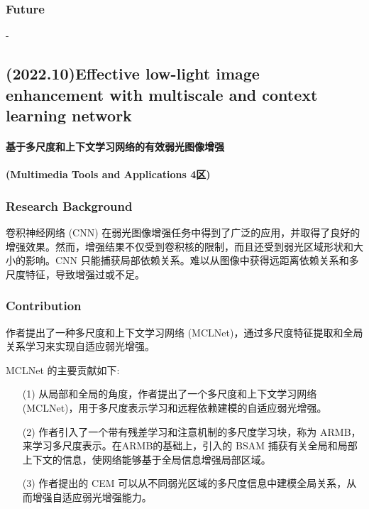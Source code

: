 \documentclass[a4paper, 10pt]{article}
\begin{document}
			\subsubsection{Future}
			
			-
		
		\subsection{(2022.10)Effective low-light image enhancement with multiscale and context learning network}
		
		\paragraph{基于多尺度和上下文学习网络的有效弱光图像增强}
		
		\paragraph{(Multimedia Tools and Applications 4区)}
		
			\subsubsection{Research Background}
			
			卷积神经网络 (CNN) 在弱光图像增强任务中得到了广泛的应用，并取得了良好的增强效果。然而，增强结果不仅受到卷积核的限制，而且还受到弱光区域形状和大小的影响。CNN 只能捕获局部依赖关系。难以从图像中获得远距离依赖关系和多尺度特征，导致增强过或不足。
			
			\subsubsection{Contribution}
			
			作者提出了一种多尺度和上下文学习网络 (MCLNet)，通过多尺度特征提取和全局关系学习来实现自适应弱光增强。
			
			MCLNet 的主要贡献如下:
			
			\begin{itemize}
				\item[(1)] 
				从局部和全局的角度，作者提出了一个多尺度和上下文学习网络 (MCLNet)，用于多尺度表示学习和远程依赖建模的自适应弱光增强。
				
				\item[(2)]
				作者引入了一个带有残差学习和注意机制的多尺度学习块，称为 ARMB，来学习多尺度表示。在ARMB的基础上，引入的 BSAM 捕获有关全局和局部上下文的信息，使网络能够基于全局信息增强局部区域。
				
				\item[(3)]
				作者提出的 CEM 可以从不同弱光区域的多尺度信息中建模全局关系，从而增强自适应弱光增强能力。
				
			\end{itemize}	
			
\end{document}
